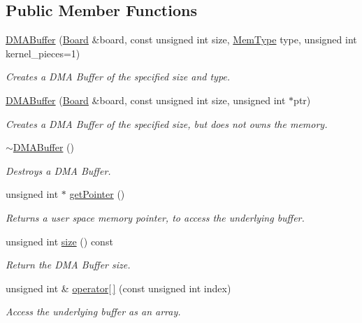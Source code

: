 \subsection*{Public Member Functions}
\begin{CompactItemize}
\item 
\hyperlink{classmprace_1_1DMABuffer_a0}{DMABuffer} (\hyperlink{classmprace_1_1Board}{Board} \&board, const unsigned int size, \hyperlink{classmprace_1_1DMABuffer_w3}{Mem\-Type} type, unsigned int kernel\_\-pieces=1)
\begin{CompactList}\small\item\em Creates a DMA Buffer of the specified size and type. \item\end{CompactList}\item 
\hyperlink{classmprace_1_1DMABuffer_a1}{DMABuffer} (\hyperlink{classmprace_1_1Board}{Board} \&board, const unsigned int size, unsigned int $\ast$ptr)
\begin{CompactList}\small\item\em Creates a DMA Buffer of the specified size, but does not owns the memory. \item\end{CompactList}\item 
\hyperlink{classmprace_1_1DMABuffer_a2}{$\sim$DMABuffer} ()
\begin{CompactList}\small\item\em Destroys a DMA Buffer. \item\end{CompactList}\item 
unsigned int $\ast$ \hyperlink{classmprace_1_1DMABuffer_a3}{get\-Pointer} ()
\begin{CompactList}\small\item\em Returns a user space memory pointer, to access the underlying buffer. \item\end{CompactList}\item 
unsigned int \hyperlink{classmprace_1_1DMABuffer_a4}{size} () const 
\begin{CompactList}\small\item\em Return the DMA Buffer size. \item\end{CompactList}\item 
unsigned int \& \hyperlink{classmprace_1_1DMABuffer_a5}{operator\mbox{[}$\,$\mbox{]}} (const unsigned int index)
\begin{CompactList}\small\item\em Access the underlying buffer as an array. \item\end{CompactList}\item 

\end{CompactItemize}
